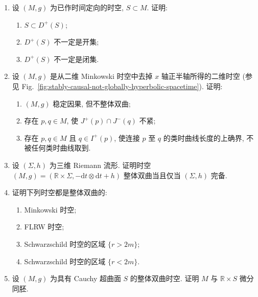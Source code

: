 \begin{RiemannExercise}
\begin{enumerate}[label=(\arabic*),ref=\arabic*,leftmargin=*]
\item\label{ex:future-domain-of-dependence-examples}
设 $(M,g)$ 为已作时间定向的时空, $S\subset M$. 证明:
\begin{enumerate}[label=(\alph*),leftmargin=*]
\item $S\subset D^+(S)$;
\item $D^+(S)$ 不一定是开集;
\item $D^+(S)$ 不一定是闭集.
\end{enumerate}
\item\label{ex:slit-minkowski-spacetime}
设 $(M,g)$ 是从二维 Minkowski 时空中去掉 $x$ 轴正半轴所得的二维时空 (参见 Fig.~\ref{fig:stably-causal-not-globally-hyperbolic-spacetime}). 证明:
\begin{enumerate}[label=(\alph*),leftmargin=*]
\item $(M,g)$ 稳定因果, 但不整体双曲;
\item 存在 $p,q\in M$, 使 $J^+(p)\cap J^-(q)$ 不紧;
\item 存在 $p,q\in M$ 且 $q\in I^+(p)$, 使连接 $p$ 至 $q$ 的类时曲线长度的上确界, 不被任何类时曲线取到.
\end{enumerate}
\item\label{ex:global-hyperbolicity-of-product-spacetime}
设 $(\Sigma,h)$ 为三维 Riemann 流形. 证明时空 $(M,g)=(\mathbb{R}\times\Sigma,-\mathrm{d}t\otimes\mathrm{d}t+h)$ 整体双曲当且仅当 $(\Sigma,h)$ 完备.
\item\label{ex:globally-hyperbolic-spacetime-examples}
证明下列时空都是整体双曲的:
\begin{enumerate}[label=(\alph*),leftmargin=*]
\item Minkowski 时空;
\item FLRW 时空;
\item Schwarzschild 时空的区域 $\{r>2m\}$;
\item Schwarzschild 时空的区域 $\{r<2m\}$.
\end{enumerate}
\item\label{ex:globally-hyperbolic-spacetime-splitting}
设 $(M,g)$ 为具有 Cauchy 超曲面 $S$ 的整体双曲时空. 证明 $M$ 与 $\mathbb{R}\times S$ 微分同胚.
\end{enumerate}
\end{RiemannExercise}
